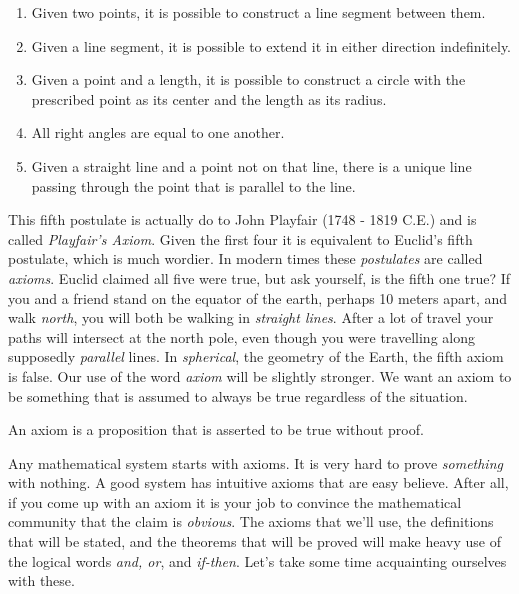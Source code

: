             \begin{enumerate}
                \item Given two points, it is possible to construct a line
                    segment between them.
                \item Given a line segment, it is possible to extend it in
                    either direction indefinitely.
                \item Given a point and a length, it is possible to construct a
                    circle with the prescribed point as its center and the
                    length as its radius.
                \item All right angles are equal to one another.
                \item Given a straight line and a point not on that line,
                    there is a unique line passing through the point that is
                    parallel to the line.
            \end{enumerate}
            This fifth postulate is actually do to John Playfair
            (1748 - 1819 C.E.) and is called \textit{Playfair's Axiom}. Given
            the first four it is equivalent to Euclid's fifth postulate, which
            is much wordier. In modern times these \textit{postulates} are
            called \textit{axioms}. Euclid claimed all five were true, but ask
            yourself, is the fifth one true? If you and a friend stand on the
            equator of the earth, perhaps 10 meters apart, and walk
            \textit{north}, you will both be walking in \textit{straight lines}.
            After a lot of travel your paths will intersect at the north pole,
            even though you were travelling along supposedly \textit{parallel}
            lines. In \textit{spherical}, the geometry of the Earth, the fifth
            axiom is false. Our use of the word \textit{axiom} will be slightly
            stronger. We want an axiom to be something that is assumed to
            always be true regardless of the situation.
            \begin{definition}
                An axiom is a proposition that is asserted to be true
                without proof.
            \end{definition}
            Any mathematical system starts with axioms. It is very hard to prove
            \textit{something} with nothing. A good system has intuitive axioms
            that are easy believe. After all, if you come up with an axiom it
            is your job to convince the mathematical community that the claim
            is \textit{obvious}. The axioms that we'll use, the definitions
            that will be stated, and the theorems that will be proved will make
            heavy use of the logical words \textit{and, or}, and
            \textit{if-then}. Let's take some time acquainting ourselves with
            these.
